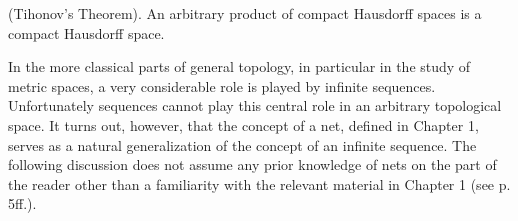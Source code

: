 (Tihonov's Theorem). An arbitrary product of compact Hausdorff spaces is a compact Hausdorff space.

In the more classical parts of general topology, in particular in the study of metric spaces, a very considerable role is played by infinite sequences. Unfortunately sequences cannot play this central role in an arbitrary topological space. It turns out, however, that the concept of a net, defined in Chapter 1, serves as a natural generalization of the concept of an infinite sequence. The following discussion does not assume any prior knowledge of nets on the part of the reader other than a familiarity with the relevant material in Chapter 1 (see p. 5ff.).
